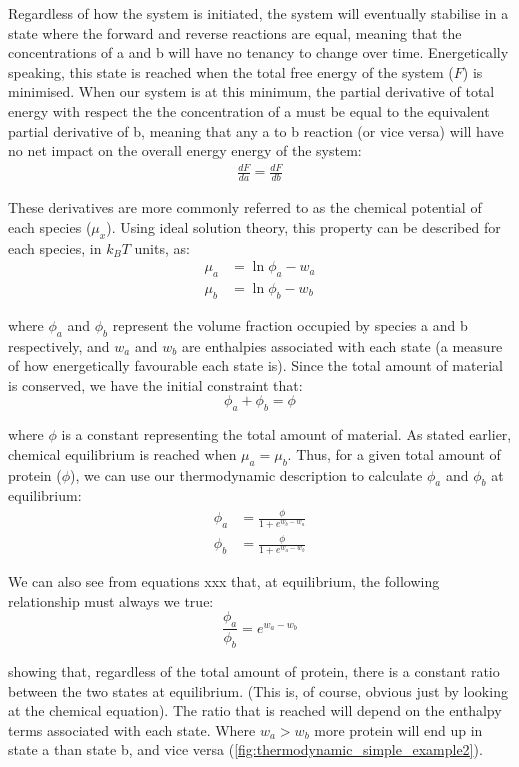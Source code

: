 \documentclass[12pt]{"article"}
\begin{document}
Regardless of how the system is initiated, the system will eventually stabilise in a state where the forward and reverse reactions are equal, meaning that the concentrations of a and b will have no tenancy to change over time. Energetically speaking, this state is reached when the total free energy of the system ($F$) is minimised. When our system is at this minimum, the partial derivative of total energy with respect the the concentration of a must be equal to the equivalent partial derivative of b, meaning that any a to b reaction (or vice versa) will have no net impact on the overall energy energy of the system:
\begin{align}
\frac{dF}{da} = \frac{dF}{db}
\end{align}

These derivatives are more commonly referred to as the chemical potential of each species ($\mu_x$). Using ideal solution theory, this property can be described for each species, in $k_BT$ units, as:
\begin{align}
\mu_a &= \ln\phi_a - w_a\\
\mu_b &= \ln\phi_b - w_b
\end{align} 

where $\phi_a$ and $\phi_b$ represent the volume fraction occupied by species a and b respectively, and $w_a$ and $w_b$ are enthalpies associated with each state (a measure of how energetically favourable each state is). Since the total amount of material is conserved, we have the initial constraint that:
\begin{equation}
\phi_a + \phi_b = \phi
\end{equation}

where $\phi$ is a constant representing the total amount of material. As stated earlier, chemical equilibrium is reached when $\mu_a = \mu_b$. Thus, for a given total amount of protein ($\phi$), we can use our thermodynamic description to calculate $\phi_a$ and $\phi_b$ at equilibrium:
\begin{align}
\phi_a &= \frac{\phi}{1 + e^{w_b - w_a}}\\
\phi_b &= \frac{\phi}{1 + e^{w_a - w_b}}
\end{align}

We can also see from equations xxx that, at equilibrium, the following relationship must always we true:
\begin{equation}
\frac{\phi_a}{\phi_b} = e^{w_a - w_b}
\end{equation}

showing that, regardless of the total amount of protein, there is a constant ratio between the two states at equilibrium. (This is, of course, obvious just by looking at the chemical equation). The ratio that is reached will depend on the enthalpy terms associated with each state. Where $w_a > w_b$ more protein will end up in state a than state b, and vice versa (\cref{fig:thermodynamic_simple_example2}).\\
\end{document}
